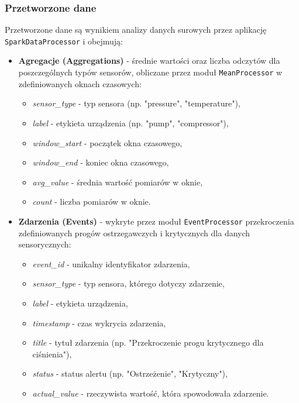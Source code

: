 \newpage

\subsubsection{Przetworzone dane}
\label{subsubsec:przetworzone_dane}

Przetworzone dane są wynikiem analizy danych surowych przez aplikację \texttt{SparkDataProcessor} i obejmują:

\begin{itemize}
    \item \textbf{Agregacje (Aggregations)} - średnie wartości oraz liczba odczytów dla poszczególnych typów sensorów, obliczane przez moduł \texttt{MeanProcessor} w zdefiniowanych oknach czasowych:
    \begin{itemize}
        \item \textit{sensor\_type} - typ sensora (np. "pressure", "temperature"),
        \item \textit{label} - etykieta urządzenia (np. "pump", "compressor"),
        \item \textit{window\_start} - początek okna czasowego,
        \item \textit{window\_end} - koniec okna czasowego,
        \item \textit{avg\_value} - średnia wartość pomiarów w oknie,
        \item \textit{count} - liczba pomiarów w oknie.
    \end{itemize}
    
    \item \textbf{Zdarzenia (Events)} - wykryte przez moduł \texttt{EventProcessor} przekroczenia zdefiniowanych progów ostrzegawczych i krytycznych dla danych sensorycznych:
    \begin{itemize}
        \item \textit{event\_id} - unikalny identyfikator zdarzenia,
        \item \textit{sensor\_type} - typ sensora, którego dotyczy zdarzenie,
        \item \textit{label} - etykieta urządzenia,
        \item \textit{timestamp} - czas wykrycia zdarzenia,
        \item \textit{title} - tytuł zdarzenia (np. "Przekroczenie progu krytycznego dla ciśnienia"),
        \item \textit{status} - status alertu (np. "Ostrzeżenie", "Krytyczny"),
        \item \textit{actual\_value} - rzeczywista wartość, która spowodowała zdarzenie.
    \end{itemize}
    

\end{itemize}
